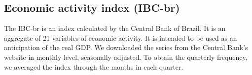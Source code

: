 \subsection{Economic activity index (IBC-br)}
The IBC-br is an index calculated by the Central Bank of Brazil. It is an aggregate of 21 variables of economic activity. It is intended to be used as an anticipation of the real GDP. We downloaded the series from the Central Bank's website in monthly level, seasonally adjusted. To obtain the quarterly frequency, we averaged the index through the months in each quarter. 
